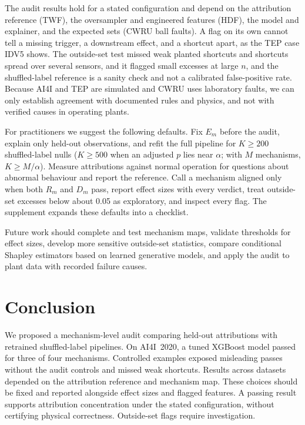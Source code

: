 \documentclass[conference]{IEEEtran}
\begin{document}
The audit results hold for a stated configuration and depend on the attribution reference (TWF), the oversampler and engineered features (HDF), the model and explainer, and the expected sets (CWRU ball faults). A flag on its own cannot tell a missing trigger, a downstream effect, and a shortcut apart, as the TEP case IDV5 shows. The outside-set test missed weak planted shortcuts and shortcuts spread over several sensors, and it flagged small excesses at large $n$, and the shuffled-label reference is a sanity check and not a calibrated false-positive rate. Because AI4I and TEP are simulated and CWRU uses laboratory faults, we can only establish agreement with documented rules and physics, and not with verified causes in operating plants.

For practitioners we suggest the following defaults. Fix $E_m$ before the audit, explain only held-out observations, and refit the full pipeline for $K\geq200$ shuffled-label nulls ($K\geq500$ when an adjusted $p$ lies near $\alpha$; with $M$ mechanisms, $K\geq M/\alpha$). Measure attributions against normal operation for questions about abnormal behaviour and report the reference. Call a mechanism aligned only when both $R_m$ and $D_m$ pass, report effect sizes with every verdict, treat outside-set excesses below about 0.05 as exploratory, and inspect every flag. The supplement expands these defaults into a checklist.

Future work should complete and test mechanism maps, validate thresholds for effect sizes, develop more sensitive outside-set statistics, compare conditional Shapley estimators based on learned generative models, and apply the audit to plant data with recorded failure causes.


\section{Conclusion}
\label{sec:conclusion}

We proposed a mechanism-level audit comparing held-out attributions with retrained shuffled-label pipelines. On AI4I~2020, a tuned XGBoost model passed for three of four mechanisms. Controlled examples exposed misleading passes without the audit controls and missed weak shortcuts. Results across datasets depended on the attribution reference and mechanism map. These choices should be fixed and reported alongside effect sizes and flagged features. A passing result supports attribution concentration under the stated configuration, without certifying physical correctness. Outside-set flags require investigation.



\end{document}
